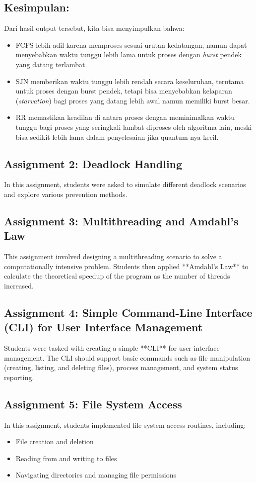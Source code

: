 \documentclass[12pt]{article}
\begin{document}
\subsection*{Kesimpulan:}
Dari hasil output tersebut, kita bisa menyimpulkan bahwa:

\begin{itemize}
    \item FCFS lebih adil karena memproses sesuai urutan kedatangan, namun dapat menyebabkan waktu tunggu lebih lama untuk proses dengan \textit{burst} pendek yang datang terlambat.
    \item SJN memberikan waktu tunggu lebih rendah secara keseluruhan, terutama untuk proses dengan burst pendek, tetapi bisa menyebabkan kelaparan (\textit{starvation}) bagi proses yang datang lebih awal namun memiliki burst besar.
    \item RR memastikan keadilan di antara proses dengan meminimalkan waktu tunggu bagi proses yang seringkali lambat diproses oleh algoritma lain, meski bisa sedikit lebih lama dalam penyelesaian jika quantum-nya kecil.
\end{itemize}

\subsection{Assignment 2: Deadlock Handling}
In this assignment, students were asked to simulate different deadlock scenarios and explore various prevention methods.

\subsection{Assignment 3: Multithreading and Amdahl's Law}
This assignment involved designing a multithreading scenario to solve a computationally intensive problem. Students then applied **Amdahl's Law** to calculate the theoretical speedup of the program as the number of threads increased.

\subsection{Assignment 4: Simple Command-Line Interface (CLI) for User Interface Management}
Students were tasked with creating a simple **CLI** for user interface management. The CLI should support basic commands such as file manipulation (creating, listing, and deleting files), process management, and system status reporting.

\subsection{Assignment 5: File System Access}
In this assignment, students implemented file system access routines, including:
\begin{itemize}
    \item File creation and deletion
    \item Reading from and writing to files
    \item Navigating directories and managing file permissions
\end{itemize}
\end{document}
